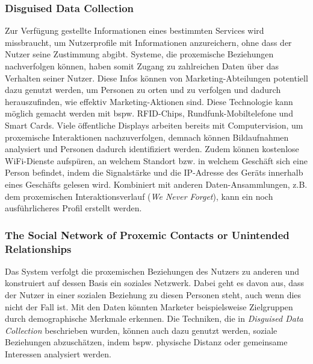 \documentclass[a4paper]{article}
\begin{document}
\subsubsection{Disguised Data Collection}
Zur Verfügung gestellte Informationen eines bestimmten Services wird missbraucht, um Nutzerprofile mit Informationen anzureichern, ohne dass der Nutzer seine Zustimmung abgibt. Systeme, die proxemische Beziehungen nachverfolgen können, haben somit Zugang zu zahlreichen Daten über das Verhalten seiner Nutzer. Diese Infos können von Marketing-Abteilungen potentiell dazu genutzt werden, um Personen zu orten und zu verfolgen und dadurch herauszufinden, wie effektiv Marketing-Aktionen sind. Diese Technologie kann möglich gemacht werden mit bspw. RFID-Chips, Rundfunk-Mobiltelefone und Smart Cards. Viele öffentliche Displays arbeiten bereits mit Computervision, um proxemische Interaktionen nachzuverfolgen, demnach können Bildaufnahmen analysiert und Personen dadurch identifiziert werden. Zudem können kostenlose WiFi-Dienste aufspüren, an welchem Standort bzw. in welchem Geschäft sich eine Person befindet, indem die Signalstärke und die IP-Adresse des Geräts innerhalb eines Geschäfts gelesen wird.\newline
Kombiniert mit anderen Daten-Ansammlungen, z.B. dem proxemischen Interaktionsverlauf (\textit{We Never Forget}), kann ein noch ausführlicheres Profil erstellt werden.

\subsubsection{The Social Network of Proxemic Contacts or Unintended Relationships}
Das System verfolgt die proxemischen Beziehungen des Nutzers zu anderen und konstruiert auf dessen Basis ein soziales Netzwerk. Dabei geht es davon aus, dass der Nutzer in einer sozialen Beziehung zu diesen Personen steht, auch wenn dies nicht der Fall ist.\newline
Mit den Daten könnten Marketer beispielsweise Zielgruppen durch demographische Merkmale erkennen. Die Techniken, die in \textit{Disguised Data Collection} beschrieben wurden, können auch dazu genutzt werden, soziale Beziehungen abzuschätzen, indem bspw. physische Distanz oder gemeinsame Interessen analysiert werden.
\end{document}
